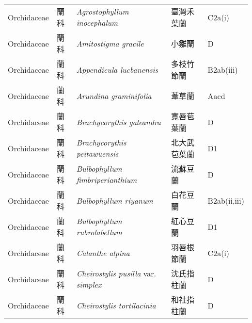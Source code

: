{\begin{longtable}{p{2.5cm}p{2.5cm}p{4.5cm}p{2.5cm}p{3cm}}
    Orchidaceae & 蘭科 & \textit{Agrostophyllum inocephalum}  & 臺灣禾葉蘭 & C2a(i) \index{Agrostophyllum@\textit{Agrostophyllum}!inocephalum@\textit{inocephalum}}  \index{臺灣禾葉蘭} \\
    Orchidaceae & 蘭科 & \textit{Amitostigma gracile}  & 小雛蘭 & D \index{Amitostigma@\textit{Amitostigma}!gracile@\textit{gracile}}  \index{小雛蘭} \\
    Orchidaceae & 蘭科 & \textit{Appendicula lucbanensis}  & 多枝竹節蘭 & B2ab(iii) \index{Appendicula@\textit{Appendicula}!lucbanensis@\textit{lucbanensis}}  \index{多枝竹節蘭} \\
    Orchidaceae & 蘭科 & \textit{Arundina graminifolia}  & 葦草蘭 & Aacd \index{Arundina@\textit{Arundina}!graminifolia@\textit{graminifolia}}  \index{葦草蘭} \\
    Orchidaceae & 蘭科 & \textit{Brachycorythis galeandra}  & 寬唇苞葉蘭 & D \index{Brachycorythis@\textit{Brachycorythis}!galeandra@\textit{galeandra}}  \index{寬唇苞葉蘭} \\
    Orchidaceae & 蘭科 & \textit{Brachycorythis peitawuensis}  & 北大武苞葉蘭 & D1 \index{Brachycorythis@\textit{Brachycorythis}!peitawuensis@\textit{peitawuensis}}  \index{北大武苞葉蘭} \\
    Orchidaceae & 蘭科 & \textit{Bulbophyllum fimbriperianthium}  & 流蘇豆蘭 & D \index{Bulbophyllum@\textit{Bulbophyllum}!fimbriperianthium@\textit{fimbriperianthium}}  \index{流蘇豆蘭} \\
    Orchidaceae & 蘭科 & \textit{Bulbophyllum riyanum}  & 白花豆蘭 & B2ab(ii,iii) \index{Bulbophyllum@\textit{Bulbophyllum}!riyanum@\textit{riyanum}}  \index{白花豆蘭} \\
    Orchidaceae & 蘭科 & \textit{Bulbophyllum rubrolabellum}  & 紅心豆蘭 & D1 \index{Bulbophyllum@\textit{Bulbophyllum}!rubrolabellum@\textit{rubrolabellum}}  \index{紅心豆蘭} \\
    Orchidaceae & 蘭科 & \textit{Calanthe alpina}  & 羽唇根節蘭 & C2a(i) \index{Calanthe@\textit{Calanthe}!alpina@\textit{alpina}}  \index{羽唇根節蘭} \\
    Orchidaceae & 蘭科 & \textit{Cheirostylis pusilla} var. \textit{simplex}  & 沈氏指柱蘭 & D \index{Cheirostylis@\textit{Cheirostylis}!pusilla@\textit{pusilla}!var. simplex@var. \textit{simplex}}  \index{沈氏指柱蘭} \\
    Orchidaceae & 蘭科 & \textit{Cheirostylis tortilacinia}  & 和社指柱蘭 & D \index{Cheirostylis@\textit{Cheirostylis}!tortilacinia@\textit{tortilacinia}}  \index{和社指柱蘭} \\

\end{longtable}}
